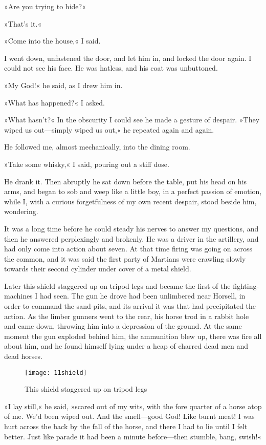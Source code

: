 »Are you trying to hide?«

»That's it.«

»Come into the house,« I said.

I went down, unfastened the door, and let him in, and locked the door again. I could not see his face. He was hatless, and his coat was unbuttoned.

»My God!« he said, as I drew him in.

»What has happened?« I asked.

»What hasn't?« In the obscurity I could see he made a gesture of despair. »They wiped us out—simply wiped us out,« he repeated again and again.

He followed me, almost mechanically, into the dining room.

»Take some whisky,« I said, pouring out a stiff dose.

He drank it. Then abruptly he sat down before the table, put his head on his arms, and began to sob and weep like a little boy, in a perfect passion of emotion, while I, with a curious forgetfulness of my own recent despair, stood beside him, wondering.

It was a long time before he could steady his nerves to answer my questions, and then he answered perplexingly and brokenly. He was a driver in the artillery, and had only come into action about seven. At that time firing was going on across the common, and it was said the first party of Martians were crawling slowly towards their second cylinder under cover of a metal shield.

Later this shield staggered up on tripod legs and became the first of the fighting-machines I had seen. The gun he drove had been unlimbered near Horsell, in order to command the sand-pits, and its arrival it was that had precipitated the action. As the limber gunners went to the rear, his horse trod in a rabbit hole and came down, throwing him into a depression of the ground. At the same moment the gun exploded behind him, the ammunition blew up, there was fire all about him, and he found himself lying under a heap of charred dead men and dead horses.

\begin{figure}[tbp]
\centering
\texttt{[image: 11shield]}
\caption{This shield staggered up on tripod legs}
\end{figure}

»I lay still,« he said, »scared out of my wits, with the fore quarter of a horse atop of me. We'd been wiped out. And the smell—good God! Like burnt meat! I was hurt across the back by the fall of the horse, and there I had to lie until I felt better. Just like parade it had been a minute before—then stumble, bang, swish!«

